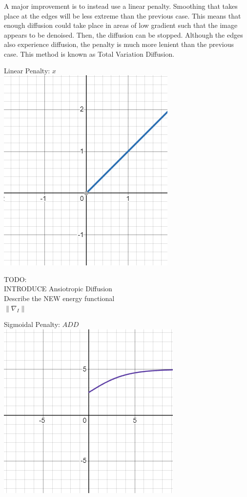 \documentclass{article}
\begin{document}
  \noindent
  A major improvement is to instead use a linear penalty. Smoothing that takes place at the edges
  will be less extreme than the previous case. This means that enough diffusion could take place
  in areas of low gradient such that the image appears to be denoised. Then, the diffusion can be stopped.
  Although the edges also experience diffusion, the penalty is much more lenient than the previous case.
  This method is known as Total Variation Diffusion.
  \begin{center}
    Linear Penalty: $x$\\
    \vspace{12pt}
    \includegraphics[scale=0.5]{../report_images/linear.png}
  \end{center}


  \newpage
  \noindent
  TODO:\\
    INTRODUCE Ansiotropic Diffusion\\
    Describe the NEW energy functional\\
  $\| \nabla_{I} \|$

  \begin{center}
    Sigmoidal Penalty: $ADD$\\
    \vspace{12pt}
    \includegraphics[scale=0.5]{../report_images/sigmoid.png}
  \end{center}
  \vspace{12pt}
\end{document}
